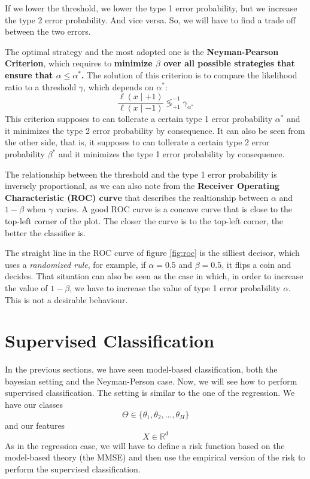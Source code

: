 If we lower the threshold, we lower the type 1 error probability, but we increase the type 2 error probability. And vice versa.
So, we will have to find a trade off between the two errors.

The optimal strategy and the most adopted one is the \textbf{Neyman-Pearson Criterion}, which requires to \textbf{minimize $\beta$ over all possible strategies that ensure that $\alpha \leq \alpha^\ast$.}
The solution of this criterion is to compare the likelihood ratio to a threshold $\gamma$, which depends on $\alpha^\ast$:
\[
    \frac{\ell(x \mid +1)}{\ell(x \mid -1)} \lessgtr^{-1}_{+1} \gamma_{\alpha^\ast}
\]
This criterion supposes to can tollerate a certain type 1 error probability $\alpha^\ast$ and it minimizes the type 2 error probability by consequence. It can also be seen from the other side, that is, it supposes to can tollerate a certain type 2 error probability $\beta^\ast$ and it minimizes the type 1 error probability by consequence.

The relationship between the threshold and the type 1 error probability is inversely proportional, as we can also note from the \textbf{Receiver Operating Characteristic (ROC) curve} that describes the realtionship between $\alpha$ and $1-\beta$ when $\gamma$ varies.
A good ROC curve is a concave curve that is close to the top-left corner of the plot. The closer the curve is to the top-left corner, the better the classifier is.


The straight line in the ROC curve of figure \ref{fig:roc} is the silliest decisor, which uses a \textit{randomized rule}, for example, if $\alpha=0.5$ and $\beta=0.5$, it flips a coin and decides.
That situation can also be seen as the case in which, in order to increase the value of $1-\beta$, we have to increase the value of type 1 error probability $\alpha$. This is not a desirable behaviour.

\section{Supervised Classification}
In the previous sections, we have seen model-based classification, both the bayesian setting and the Neyman-Person case. Now, we will see how to perform supervised classification. The setting is similar to the one of the regression.
We have our classes
\[
    \Theta \in \{\theta_1, \theta_2, \dots, \theta_H\}
\]
and our features 
\[
    X \in \mathbb{R}^d
\]
As in the regression case, we will have to define a risk function based on the model-based theory (the MMSE) and then use the empirical version of the risk to perform the supervised classification.

